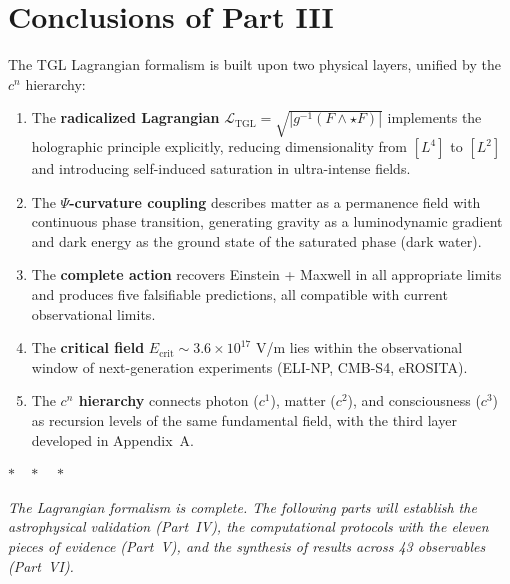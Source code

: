 \documentclass[12pt,a4paper,twoside]{article}
\newcommand{\Ltgl}{\mathcal{L}_{\text{TGL}}}
\newcommand{\Psifield}{\Psi}
\newcommand{\Ecrit}{E_{\text{crit}}}
\begin{document}

\section{Conclusions of Part III}


The TGL Lagrangian formalism is built upon two physical layers, unified by the $c^n$ hierarchy:

\begin{enumerate}[nosep]
\item The \textbf{radicalized Lagrangian} $\Ltgl = \sqrt{|g^{-1}(F \wedge \star F)|}$ implements the holographic principle explicitly, reducing dimensionality from $[L^4]$ to $[L^2]$ and introducing self-induced saturation in ultra-intense fields.

\item The \textbf{$\Psifield$-curvature coupling} describes matter as a permanence field with continuous phase transition, generating gravity as a luminodynamic gradient and dark energy as the ground state of the saturated phase (dark water).

\item The \textbf{complete action} recovers Einstein + Maxwell in all appropriate limits and produces five falsifiable predictions, all compatible with current observational limits.

\item The \textbf{critical field} $\Ecrit \sim 3.6 \times 10^{17}$ V/m lies within the observational window of next-generation experiments (ELI-NP, CMB-S4, eROSITA).

\item The \textbf{$c^n$ hierarchy} connects photon ($c^1$), matter ($c^2$), and consciousness ($c^3$) as recursion levels of the same fundamental field, with the third layer developed in Appendix~A.
\end{enumerate}

\bigskip

\begin{center}
$\ast\quad\ast\quad\ast$
\end{center}
\bigskip

\noindent\textit{The Lagrangian formalism is complete. The following parts will establish the astrophysical validation (Part~IV), the computational protocols with the eleven pieces of evidence (Part~V), and the synthesis of results across 43 observables (Part~VI).}
\end{document}
